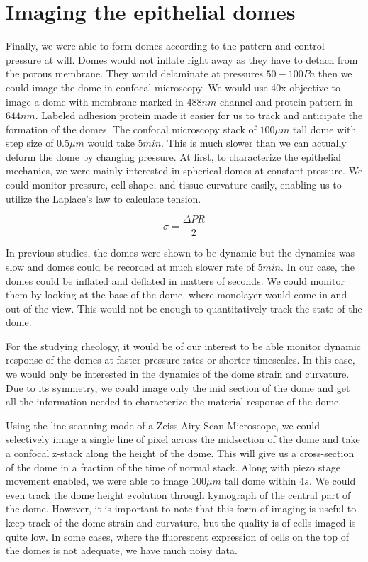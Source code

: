 \hypertarget{imaging-the-epithelial-domes}{%
\section{Imaging the epithelial
domes}\label{imaging-the-epithelial-domes}}

Finally, we were able to form domes according to the pattern and control
pressure at will. Domes would not inflate right away as they have to
detach from the porous membrane. They would delaminate at pressures
\(50-100Pa\) then we could image the dome in confocal microscopy. We
would use 40x objective to image a dome with membrane marked in
\(488nm\) channel and protein pattern in \(644nm\). Labeled adhesion
protein made it easier for us to track and anticipate the formation of
the domes. The confocal microscopy stack of \(100 \mu m\) tall dome with
step size of \(0.5\mu m\) would take \(5min\). This is much slower than
we can actually deform the dome by changing pressure. At first, to
characterize the epithelial mechanics, we were mainly interested in
spherical domes at constant pressure. We could monitor pressure, cell
shape, and tissue curvature easily, enabling us to utilize the Laplace's
law to calculate tension.

\[\sigma = \frac{\Delta PR }{2}\]

In previous studies, the domes were shown to be dynamic but the dynamics
was slow and domes could be recorded at much slower rate of \(5min\). In
our case, the domes could be inflated and deflated in matters of
seconds. We could monitor them by looking at the base of the dome, where
monolayer would come in and out of the view. This would not be enough to
quantitatively track the state of the dome.

For the studying rheology, it would be of our interest to be able
monitor dynamic response of the domes at faster pressure rates or
shorter timescales. In this case, we would only be interested in the
dynamics of the dome strain and curvature. Due to its symmetry, we could
image only the mid section of the dome and get all the information
needed to characterize the material response of the dome.

Using the line scanning mode of a Zeiss Airy Scan Microscope, we could
selectively image a single line of pixel across the midsection of the
dome and take a confocal z-stack along the height of the dome. This will
give us a cross-section of the dome in a fraction of the time of normal
stack. Along with piezo stage movement enabled, we were able to image
\(100 \mu m\) tall dome within \(4s\). We could even track the dome
height evolution through kymograph of the central part of the dome.
However, it is important to note that this form of imaging is useful to
keep track of the dome strain and curvature, but the quality is of cells
imaged is quite low. In some cases, where the fluorescent expression of
cells on the top of the domes is not adequate, we have much noisy data.

